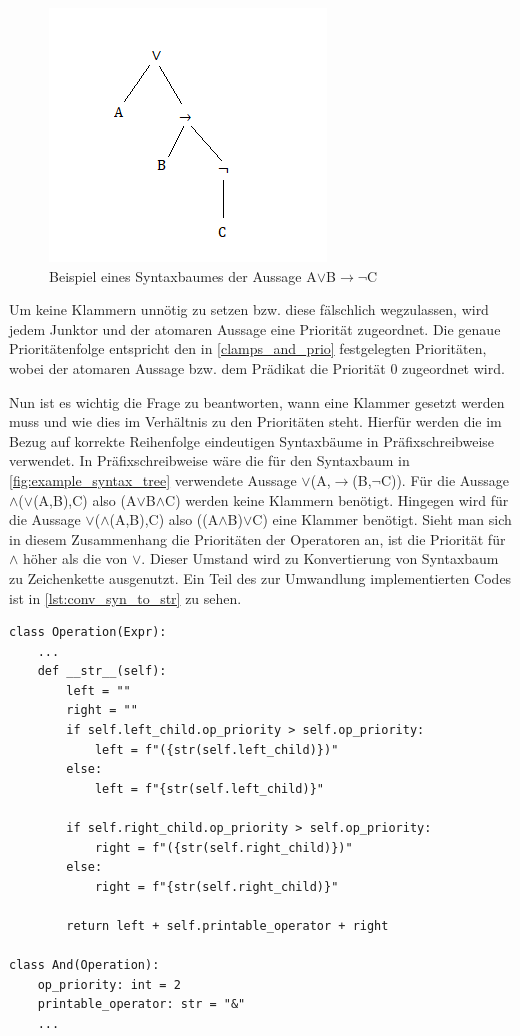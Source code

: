 \begin{figure}[H]
\begin{center}
\includegraphics[scale=1]{images/example_syntax_tree.png}
\caption{Beispiel eines Syntaxbaumes der Aussage A$\vee$B$\rightarrow\neg$C}
\label{fig:example_syntax_tree}
\end{center}
\end{figure}

Um keine Klammern unnötig zu setzen bzw. diese fälschlich wegzulassen, wird jedem Junktor und der atomaren Aussage eine Priorität zugeordnet. Die genaue Prioritätenfolge entspricht den in \autoref{clamps_and_prio} festgelegten Prioritäten, wobei der atomaren Aussage bzw. dem Prädikat die Priorität 0 zugeordnet wird.

Nun ist es wichtig die Frage zu beantworten, wann eine Klammer gesetzt werden muss und wie dies im Verhältnis zu den Prioritäten steht. Hierfür werden die im Bezug auf korrekte Reihenfolge eindeutigen Syntaxbäume in Präfixschreibweise verwendet. In Präfixschreibweise wäre die für den Syntaxbaum in \autoref{fig:example_syntax_tree} verwendete Aussage $\vee$(A,$\rightarrow$(B,$\neg$C)). Für die Aussage $\wedge$($\vee$(A,B),C) also (A$\vee$B$\wedge$C) werden keine Klammern benötigt. Hingegen wird für die Aussage  $\vee$($\wedge$(A,B),C) also ((A$\wedge$B)$\vee$C) eine Klammer benötigt. Sieht man sich in diesem Zusammenhang die Prioritäten der Operatoren an, ist die Priorität für $\wedge$ höher als die von $\vee$. Dieser Umstand wird zu Konvertierung von Syntaxbaum zu Zeichenkette ausgenutzt. Ein Teil des zur Umwandlung implementierten Codes ist in \autoref{lst:conv_syn_to_str} zu sehen.

\begin{lstlisting}[caption={Umwandlung von Syntaxbaum zu Zeichenkette},label=lst:conv_syn_to_str]
class Operation(Expr):
	...
	def __str__(self):
		left = ""
		right = ""
		if self.left_child.op_priority > self.op_priority:
			left = f"({str(self.left_child)})"
		else:
			left = f"{str(self.left_child)}"
      	
      	if self.right_child.op_priority > self.op_priority:
			right = f"({str(self.right_child)})"
		else:
			right = f"{str(self.right_child)}"
		
		return left + self.printable_operator + right

class And(Operation):
	op_priority: int = 2
	printable_operator: str = "&"
	...
\end{lstlisting}

